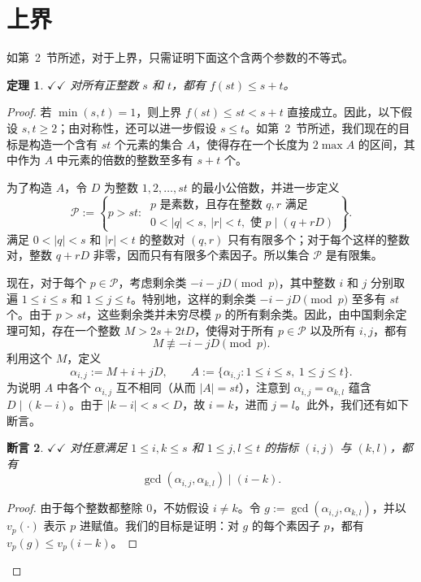 \documentclass[UTF8,a4paper,oneside,openany,fontset=fandol,zihao=-4]{ctexbook}
\theoremstyle{chinesestyle}
\newtheorem{theorem}{定理}[section]
\newtheorem{claim}[theorem]{断言}
\newcommand{\leanmark}{\ensuremath{\checkmark\!\checkmark}}
\begin{document}
\section{上界}\label{sec:upper-bound}

如第~2~节所述，对于上界，只需证明下面这个含两个参数的不等式。

\begin{theorem}\label{thm:upper}
\leanmark{} 对所有正整数 $s$ 和 $t$，都有 $f(st)\leq s+t$。
\end{theorem}

\begin{proof}
若 $\min(s,t)=1$，则上界 $f(st)\leq st<s+t$ 直接成立。因此，以下假设 $s,t\geq 2$；由对称性，还可以进一步假设 $s\leq t$。如第~2~节所述，我们现在的目标是构造一个含有 $st$ 个元素的集合 $A$，使得存在一个长度为 $2\max A$ 的区间，其中作为 $A$ 中元素的倍数的整数至多有 $s+t$ 个。

为了构造 $A$，令 $D$ 为整数 $1,2,\ldots,st$ 的最小公倍数，并进一步定义
\[
\mathcal P:=\left\{p>st:\ \begin{array}{l}
p\text{ 是素数，且存在整数 }q,r\text{ 满足}\\
0<|q|<s,\ |r|<t,\text{ 使 }p\mid(q+rD)
\end{array}\right\}.
\]
满足 $0<|q|<s$ 和 $|r|<t$ 的整数对 $(q,r)$ 只有有限多个；对于每个这样的整数对，整数 $q+rD$ 非零，因而只有有限多个素因子。所以集合 $\mathcal P$ 是有限集。

现在，对于每个 $p\in\mathcal P$，考虑剩余类 $-i-jD\pmod p$，其中整数 $i$ 和 $j$ 分别取遍 $1\leq i\leq s$ 和 $1\leq j\leq t$。特别地，这样的剩余类 $-i-jD\pmod p$ 至多有 $st$ 个。由于 $p>st$，这些剩余类并未穷尽模 $p$ 的所有剩余类。因此，由中国剩余定理可知，存在一个整数 $M>2s+2tD$，使得对于所有 $p\in\mathcal P$ 以及所有 $i,j$，都有
\[
M\not\equiv-i-jD\pmod p.
\]
利用这个 $M$，定义
\[
\alpha_{i,j}:=M+i+jD,
\qquad
A:=\{\alpha_{i,j}:1\leq i\leq s,\ 1\leq j\leq t\}.
\]
为说明 $A$ 中各个 $\alpha_{i,j}$ 互不相同（从而 $|A|=st$），注意到 $\alpha_{i,j}=\alpha_{k,l}$ 蕴含 $D\mid(k-i)$。由于 $|k-i|<s<D$，故 $i=k$，进而 $j=l$。此外，我们还有如下断言。

\begin{claim}\label{claim:gcd}
\leanmark{} 对任意满足 $1\leq i,k\leq s$ 和 $1\leq j,l\leq t$ 的指标 $(i,j)$ 与 $(k,l)$，都有
\[
\gcd(\alpha_{i,j},\alpha_{k,l})\mid(i-k).
\]
\end{claim}

\begin{proof}
由于每个整数都整除 $0$，不妨假设 $i\ne k$。令 $g:=\gcd(\alpha_{i,j},\alpha_{k,l})$，并以 $v_p(\cdot)$ 表示 $p$ 进赋值。我们的目标是证明：对 $g$ 的每个素因子 $p$，都有 $v_p(g)\leq v_p(i-k)$。


\end{proof}
\end{proof}
\end{document}
